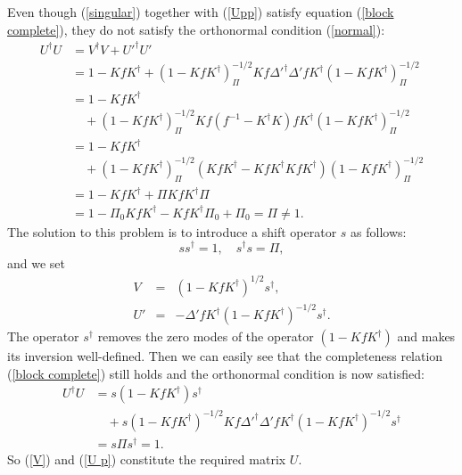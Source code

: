 \documentclass[a4paper,a4paper]{article}
\begin{document}
Even though (\ref{singular}) together with (\ref{Upp}) satisfy
equation (\ref{block complete}), they do not satisfy the
orthonormal condition (\ref{normal}):
\begin{equation}\begin{array}{rl}
U^\dag U&=V^\dag V+U'^\dag U'\\
&=1-K f K^\dag+(1-K fK^\dag)^{-1/2}_\Pi Kf\Delta'^\dag\Delta'f
K^\dag(1-K f K^\dag)^{-1/2}_\Pi\\
&=1-K f K^\dag\\
&\quad+(1-K fK^\dag)^{-1/2}_\Pi Kf(f^{-1}-K^\dag K)f
K^\dag(1-K f K^\dag)^{-1/2}_\Pi\\
&=1-K f K^\dag\\
&\quad+(1-K fK^\dag)^{-1/2}_\Pi(KfK^\dag-KfK^\dag KfK^\dag)(1-K f
K^\dag)^{-1/2}_\Pi\\
&=1-K f K^\dag+\Pi K f K^\dag\Pi\\
&=1-\Pi_0 K f K^\dag-K f K^\dag\Pi_0+\Pi_0=\Pi\ne 1.
\end{array}\end{equation}
The solution to this problem is to introduce a shift operator $s$
as follows:
\begin{equation}
ss^\dag=1,\quad s^\dag s=\Pi,\label{shift}
\end{equation}
and we set
\begin{eqnarray}
\label{V}V&=&(1-K f K^\dag)^{1/2}s^\dag,\\
\label{U p}U'&=&-\Delta'fK^\dag(1-KfK^\dag)^{-1/2}s^\dag.
\end{eqnarray}
The operator $s^\dag$ removes the zero modes of the operator
$(1-KfK^\dag)$ and makes its inversion well-defined. Then we can
easily see that the completeness relation (\ref{block complete})
still holds and the orthonormal condition is now satisfied:
\begin{equation}\begin{array}{rl}
U^\dag U&=s(1-K f K^\dag)s^\dag\\
&\quad+s(1-K fK^\dag)^{-1/2}Kf\Delta'^\dag\Delta'f K^\dag(1-K f
K^\dag)^{-1/2}s^\dag\\
&=s\Pi s^\dag=1.
\end{array}\end{equation}
So (\ref{V}) and (\ref{U p}) constitute the required matrix $U$.
\end{document}
